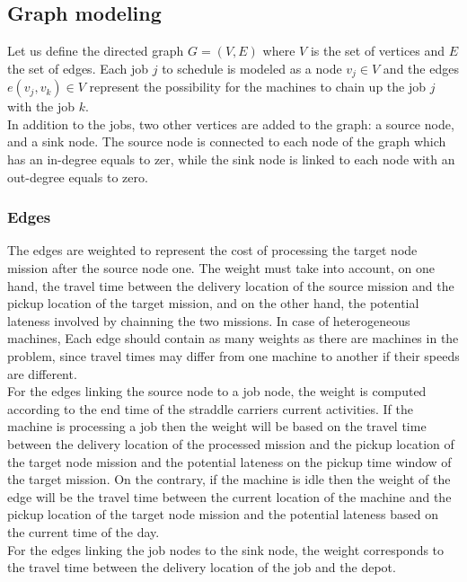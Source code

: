 \documentclass[a4paper,12pt]{article}
\begin{document}
\subsection{Graph modeling}
Let us define the directed graph $G = (V,E)$ where $V$ is the set of vertices and $E$ the set of edges. Each job $j$ to schedule is modeled as a node $v_j \in V$ and the edges $e(v_j,v_k) \in V$ represent the possibility for the machines to chain up the job $j$ with the job $k$.\\

In addition to the jobs, two other vertices are added to the graph: a source node, and a sink node. The source node is connected to each node of the graph which has an in-degree equals to zer, while the sink node is linked to each node with an out-degree equals to zero. %


\subsubsection{Edges}
The edges are weighted to represent the cost of processing the target node mission after the source node one. The weight must take into account, on one hand, the travel time between the delivery location of the source mission and the pickup location of the target mission, and on the other hand, the potential lateness involved by chainning the two missions. In case of heterogeneous machines, Each edge should contain as many weights as there are machines in the problem, since travel times may differ from one machine to another if their speeds are different.\\

For the edges linking the source node to a job node, the weight is computed according to the end time of the straddle carriers current activities. If the machine is processing a job then the weight will be based on the travel time between the delivery location of the processed mission and the pickup location of the target node mission and the potential lateness on the pickup time window of the target mission. On the contrary, if the machine is idle then the weight of the edge will be the travel time between the current location of the machine and the pickup location of the target node mission and the potential lateness based on the current time of the day.\\

For the edges linking the job nodes to the sink node, the weight corresponds to the travel time between the delivery location of the job and the depot.\\
\end{document}
